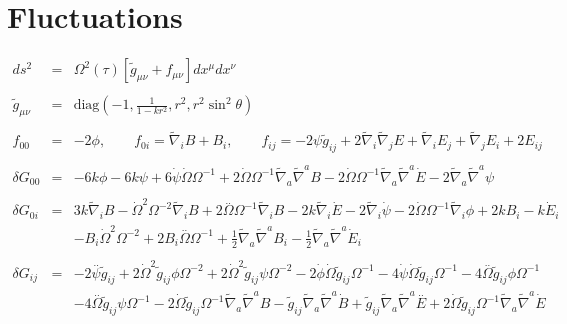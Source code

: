 \documentclass[10pt,letterpaper]{article}
\numberwithin{equation}{section}
\begin{document}
\section{Fluctuations}
\begin{eqnarray}
ds^2 &=& \Omega^2(\tau)[\tilde g_{\mu\nu}+ f_{\mu\nu}] dx^\mu dx^\nu
\\ \nonumber\\
\tilde g_{\mu\nu} &=& \text{diag}\left(-1,\frac{1}{1-kr^2},r^2,r^2\sin^2\theta\right)
\\ \nonumber\\
f_{00} &=& -2\phi,\qquad f_{0i} = \tilde\nabla_i B + B_i,\qquad f_{ij} = -2\psi \tilde g_{ij} + 2\tilde\nabla_i\tilde\nabla_j E + 
\tilde\nabla_i E_j +\tilde\nabla_j E_i + 2E_{ij}
\label{svt}
\\ \nonumber\\
\delta G_{00}&=& -6 k \phi - 6 k \psi + 6 \dot{\psi} \dot{\Omega} \Omega^{-1} + 2 \dot{\Omega} \Omega^{-1} \tilde{\nabla}_{a}\tilde{\nabla}^{a}B - 2 \dot{\Omega} \Omega^{-1} \tilde{\nabla}_{a}\tilde{\nabla}^{a}\dot{E} - 2 \tilde{\nabla}_{a}\tilde{\nabla}^{a}\psi 
\\  \nonumber\\ 
\delta G_{0i}&=& 3 k \tilde{\nabla}_{i}B -  \dot{\Omega}^2 \Omega^{-2} \tilde{\nabla}_{i}B + 2 \overset{..}{\Omega} \Omega^{-1} \tilde{\nabla}_{i}B - 2 k \tilde{\nabla}_{i}\dot{E} - 2 \tilde{\nabla}_{i}\dot{\psi} - 2 \dot{\Omega} \Omega^{-1} \tilde{\nabla}_{i}\phi +2 k B_{i} -  k \dot{E}_{i} \nonumber \\ 
&& -  B_{i} \dot{\Omega}^2 \Omega^{-2} + 2 B_{i} \overset{..}{\Omega} \Omega^{-1} + \tfrac{1}{2} \tilde{\nabla}_{a}\tilde{\nabla}^{a}B_{i} -  \tfrac{1}{2} \tilde{\nabla}_{a}\tilde{\nabla}^{a}\dot{E}_{i}
\\  \nonumber\\ 
\delta G_{ij}&=& -2 \overset{..}{\psi} \tilde{g}_{ij} + 2 \dot{\Omega}^2 \tilde{g}_{ij} \phi \Omega^{-2} + 2 \dot{\Omega}^2 \tilde{g}_{ij} \psi \Omega^{-2} - 2 \dot{\phi} \dot{\Omega} \tilde{g}_{ij} \Omega^{-1} - 4 \dot{\psi} \dot{\Omega} \tilde{g}_{ij} \Omega^{-1} - 4 \overset{..}{\Omega} \tilde{g}_{ij} \phi \Omega^{-1} \nonumber \\ 
&& - 4 \overset{..}{\Omega} \tilde{g}_{ij} \psi \Omega^{-1} - 2 \dot{\Omega} \tilde{g}_{ij} \Omega^{-1} \tilde{\nabla}_{a}\tilde{\nabla}^{a}B -  \tilde{g}_{ij} \tilde{\nabla}_{a}\tilde{\nabla}^{a}\dot{B} + \tilde{g}_{ij} \tilde{\nabla}_{a}\tilde{\nabla}^{a}\overset{..}{E} + 2 \dot{\Omega} \tilde{g}_{ij} \Omega^{-1} \tilde{\nabla}_{a}\tilde{\nabla}^{a}\dot{E} \nonumber \\ 

\end{eqnarray}
\end{document}
